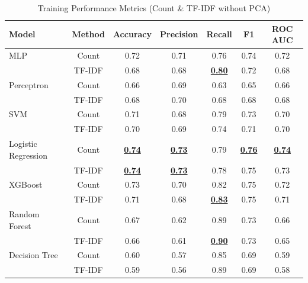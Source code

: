 \begin{table}[H]
    \centering
    \caption{Training Performance Metrics (Count \& TF-IDF without PCA)}
    \label{tab:training-count-tfidf}
    \begin{tabular}{|l|c|c|c|c|c|c|}
        \hline
        \textbf{Model} & \textbf{Method} & \textbf{Accuracy} & \textbf{Precision} & \textbf{Recall} & \textbf{F1} & \textbf{ROC AUC} \\
        \hline
        MLP & Count & 0.72 & 0.71 & 0.76 & 0.74 & 0.72 \\
        & TF-IDF & 0.68 & 0.68 & \textbf{\underline{0.80}} & 0.72 & 0.68 \\
        \hline
        Perceptron & Count & 0.66 & 0.69 & 0.63 & 0.65 & 0.66 \\
        & TF-IDF & 0.68 & 0.70 & 0.68 & 0.68 & 0.68 \\
        \hline
        SVM & Count & 0.71 & 0.68 & 0.79 & 0.73 & 0.70 \\
        & TF-IDF & 0.70 & 0.69 & 0.74 & 0.71 & 0.70 \\
        \hline
        Logistic Regression & Count & \textbf{\underline{0.74}} & \textbf{\underline{0.73}} & 0.79 & \textbf{\underline{0.76}} & \textbf{\underline{0.74}} \\
        & TF-IDF & \textbf{\underline{0.74}} & \textbf{\underline{0.73}} & 0.78 & 0.75 & 0.73 \\
        \hline
        XGBoost & Count & 0.73 & 0.70 & 0.82 & 0.75 & 0.72 \\
        & TF-IDF & 0.71 & 0.68 & \textbf{\underline{0.83}} & 0.75 & 0.71 \\
        \hline
        Random Forest & Count & 0.67 & 0.62 & 0.89 & 0.73 & 0.66 \\
        & TF-IDF & 0.66 & 0.61 & \textbf{\underline{0.90}} & 0.73 & 0.65 \\
        \hline
        Decision Tree & Count & 0.60 & 0.57 & 0.85 & 0.69 & 0.59 \\
        & TF-IDF & 0.59 & 0.56 & 0.89 & 0.69 & 0.58 \\
        \hline
    \end{tabular}
\end{table}

